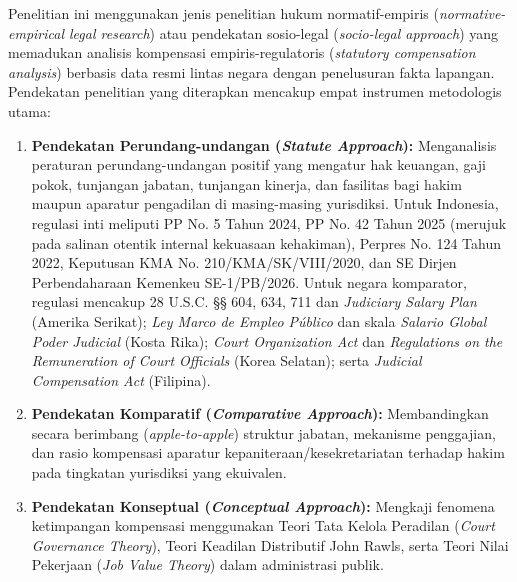\documentclass[12pt, a4paper]{article}
\begin{document}
Penelitian ini menggunakan jenis penelitian hukum normatif-empiris (\textit{normative-empirical legal research}) atau pendekatan sosio-legal (\textit{socio-legal approach}) yang memadukan analisis kompensasi empiris-regulatoris (\textit{statutory compensation analysis}) berbasis data resmi lintas negara dengan penelusuran fakta lapangan. Pendekatan penelitian yang diterapkan mencakup empat instrumen metodologis utama:
\begin{enumerate}
    \item \textbf{Pendekatan Perundang-undangan (\textit{Statute Approach}):} Menganalisis peraturan perundang-undangan positif yang mengatur hak keuangan, gaji pokok, tunjangan jabatan, tunjangan kinerja, dan fasilitas bagi hakim maupun aparatur pengadilan di masing-masing yurisdiksi. Untuk Indonesia, regulasi inti meliputi PP No. 5 Tahun 2024, PP No. 42 Tahun 2025 (merujuk pada salinan otentik internal kekuasaan kehakiman), Perpres No. 124 Tahun 2022, Keputusan KMA No. 210/KMA/SK/VIII/2020, dan SE Dirjen Perbendaharaan Kemenkeu SE-1/PB/2026. Untuk negara komparator, regulasi mencakup 28 U.S.C. §§ 604, 634, 711 dan \textit{Judiciary Salary Plan} (Amerika Serikat); \textit{Ley Marco de Empleo Público} dan skala \textit{Salario Global Poder Judicial} (Kosta Rika); \textit{Court Organization Act} dan \textit{Regulations on the Remuneration of Court Officials} (Korea Selatan); serta \textit{Judicial Compensation Act} (Filipina).
    \item \textbf{Pendekatan Komparatif (\textit{Comparative Approach}):} Membandingkan secara berimbang (\textit{apple-to-apple}) struktur jabatan, mekanisme penggajian, dan rasio kompensasi aparatur kepaniteraan/kesekretariatan terhadap hakim pada tingkatan yurisdiksi yang ekuivalen.
    \item \textbf{Pendekatan Konseptual (\textit{Conceptual Approach}):} Mengkaji fenomena ketimpangan kompensasi menggunakan Teori Tata Kelola Peradilan (\textit{Court Governance Theory}), Teori Keadilan Distributif John Rawls, serta Teori Nilai Pekerjaan (\textit{Job Value Theory}) dalam administrasi publik.

\end{enumerate}
\end{document}
